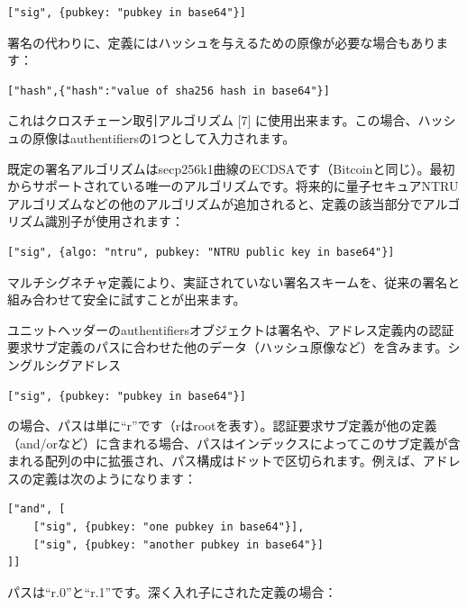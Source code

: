 \documentclass[a4paper, dvipdfmx]{jsarticle}
\begin{document}
\begin{lstlisting}[basicstyle=\ttfamily\footnotesize, frame=none]
["sig", {pubkey: "pubkey in base64"}]
\end{lstlisting}

署名の代わりに、定義にはハッシュを与えるための原像が必要な場合もあります：

\begin{lstlisting}[basicstyle=\ttfamily\footnotesize, frame=none]
["hash",{"hash":"value of sha256 hash in base64"}]
\end{lstlisting}

\noindent これはクロスチェーン取引アルゴリズム [7] に使用出来ます。この場合、ハッシュの原像はauthentifiersの1つとして入力されます。

既定の署名アルゴリズムはsecp256k1曲線のECDSAです（Bitcoinと同じ）。最初からサポートされている唯一のアルゴリズムです。将来的に量子セキュアNTRUアルゴリズムなどの他のアルゴリズムが追加されると、定義の該当部分でアルゴリズム識別子が使用されます：
\begin{lstlisting}[basicstyle=\ttfamily\footnotesize, frame=none]
["sig", {algo: "ntru", pubkey: "NTRU public key in base64"}]
\end{lstlisting}

マルチシグネチャ定義により、実証されていない署名スキームを、従来の署名と組み合わせて安全に試すことが出来ます。

ユニットヘッダーのauthentifiersオブジェクトは署名や、アドレス定義内の認証要求サブ定義のパスに合わせた他のデータ（ハッシュ原像など）を含みます。シングルシグアドレス

\begin{lstlisting}[basicstyle=\ttfamily\footnotesize, frame=none]
["sig", {pubkey: "pubkey in base64"}]
\end{lstlisting}

\noindent の場合、パスは単に“r”です（rはrootを表す）。認証要求サブ定義が他の定義（and/orなど）に含まれる場合、パスはインデックスによってこのサブ定義が含まれる配列の中に拡張され、パス構成はドットで区切られます。例えば、アドレスの定義は次のようになります：

\begin{lstlisting}[basicstyle=\ttfamily\footnotesize, frame=none]
["and", [
    ["sig", {pubkey: "one pubkey in base64"}],
    ["sig", {pubkey: "another pubkey in base64"}]
]]
\end{lstlisting}

\noindent パスは“r.0”と“r.1”です。深く入れ子にされた定義の場合：
\end{document}
